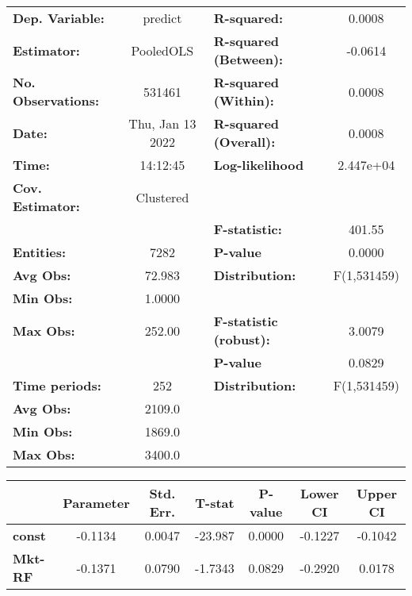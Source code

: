 \begin{center}
\begin{tabular}{lclc}
\toprule
\textbf{Dep. Variable:}    &      predict       & \textbf{  R-squared:         }   &      0.0008      \\
\textbf{Estimator:}        &     PooledOLS      & \textbf{  R-squared (Between):}  &     -0.0614      \\
\textbf{No. Observations:} &       531461       & \textbf{  R-squared (Within):}   &      0.0008      \\
\textbf{Date:}             &  Thu, Jan 13 2022  & \textbf{  R-squared (Overall):}  &      0.0008      \\
\textbf{Time:}             &      14:12:45      & \textbf{  Log-likelihood     }   &    2.447e+04     \\
\textbf{Cov. Estimator:}   &     Clustered      & \textbf{                     }   &                  \\
\textbf{}                  &                    & \textbf{  F-statistic:       }   &      401.55      \\
\textbf{Entities:}         &        7282        & \textbf{  P-value            }   &      0.0000      \\
\textbf{Avg Obs:}          &       72.983       & \textbf{  Distribution:      }   &   F(1,531459)    \\
\textbf{Min Obs:}          &       1.0000       & \textbf{                     }   &                  \\
\textbf{Max Obs:}          &       252.00       & \textbf{  F-statistic (robust):} &      3.0079      \\
\textbf{}                  &                    & \textbf{  P-value            }   &      0.0829      \\
\textbf{Time periods:}     &        252         & \textbf{  Distribution:      }   &   F(1,531459)    \\
\textbf{Avg Obs:}          &       2109.0       & \textbf{                     }   &                  \\
\textbf{Min Obs:}          &       1869.0       & \textbf{                     }   &                  \\
\textbf{Max Obs:}          &       3400.0       & \textbf{                     }   &                  \\
\bottomrule
\end{tabular}
\begin{tabular}{lcccccc}
                & \textbf{Parameter} & \textbf{Std. Err.} & \textbf{T-stat} & \textbf{P-value} & \textbf{Lower CI} & \textbf{Upper CI}  \\
\midrule
\textbf{const}  &      -0.1134       &       0.0047       &     -23.987     &      0.0000      &      -0.1227      &      -0.1042       \\
\textbf{Mkt-RF} &      -0.1371       &       0.0790       &     -1.7343     &      0.0829      &      -0.2920      &       0.0178       \\
\bottomrule
\end{tabular}
\end{center}
